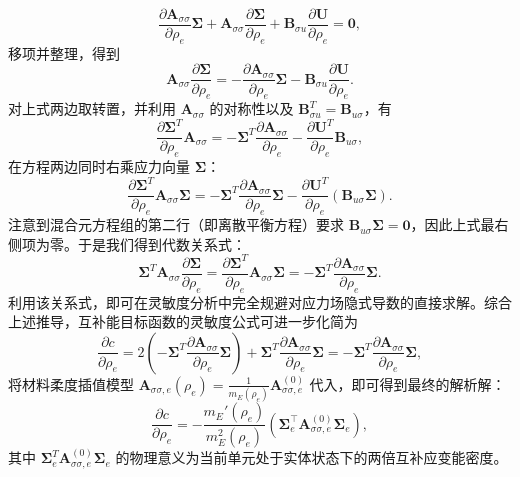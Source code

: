 \[
\frac{\partial \boldsymbol{A}_{\sigma\sigma}}{\partial \rho_e} \boldsymbol{\Sigma} + \boldsymbol{A}_{\sigma\sigma} \frac{\partial \boldsymbol{\Sigma}}{\partial \rho_e} + \boldsymbol{B}_{\sigma u} \frac{\partial \boldsymbol{U}}{\partial \rho_e} = \mathbf{0},
\]
移项并整理，得到
\[
\boldsymbol{A}_{\sigma\sigma} \frac{\partial \boldsymbol{\Sigma}}{\partial \rho_e} = - \frac{\partial \boldsymbol{A}_{\sigma\sigma}}{\partial \rho_e} \boldsymbol{\Sigma} - \boldsymbol{B}_{\sigma u} \frac{\partial \boldsymbol{U}}{\partial \rho_e}.
\]
对上式两边取转置，并利用 $\boldsymbol{A}_{\sigma\sigma}$ 的对称性以及 $\boldsymbol{B}_{\sigma u}^T = \boldsymbol{B}_{u\sigma}$，有
\[
\frac{\partial \boldsymbol{\Sigma}^T}{\partial \rho_e} \boldsymbol{A}_{\sigma\sigma} = - \boldsymbol{\Sigma}^T \frac{\partial \boldsymbol{A}_{\sigma\sigma}}{\partial \rho_e} - \frac{\partial \boldsymbol{U}^T}{\partial \rho_e} \boldsymbol{B}_{u\sigma},
\]
在方程两边同时右乘应力向量 $\boldsymbol{\Sigma}$：
\[
\frac{\partial \boldsymbol{\Sigma}^T}{\partial \rho_e} \boldsymbol{A}_{\sigma\sigma} \boldsymbol{\Sigma} = - \boldsymbol{\Sigma}^T \frac{\partial \boldsymbol{A}_{\sigma\sigma}}{\partial \rho_e} \boldsymbol{\Sigma} - \frac{\partial \boldsymbol{U}^T}{\partial \rho_e} \left( \boldsymbol{B}_{u\sigma} \boldsymbol{\Sigma} \right).
\]
注意到混合元方程组的第二行（即离散平衡方程）要求 $\boldsymbol{B}_{u\sigma}\boldsymbol{\Sigma} = \mathbf{0}$，因此上式最右侧项为零。于是我们得到代数关系式：
\[
\boldsymbol{\Sigma}^T \boldsymbol{A}_{\sigma\sigma} \frac{\partial \boldsymbol{\Sigma}}{\partial \rho_e} = \frac{\partial \boldsymbol{\Sigma}^T}{\partial \rho_e} \boldsymbol{A}_{\sigma\sigma} \boldsymbol{\Sigma} = - \boldsymbol{\Sigma}^T \frac{\partial \boldsymbol{A}_{\sigma\sigma}}{\partial \rho_e} \boldsymbol{\Sigma}.
\]
利用该关系式，即可在灵敏度分析中完全规避对应力场隐式导数的直接求解。综合上述推导，互补能目标函数的灵敏度公式可进一步化简为
\[
\frac{\partial c}{\partial \rho_e} = 2 \left( - \boldsymbol{\Sigma}^T \frac{\partial \boldsymbol{A}_{\sigma\sigma}}{\partial \rho_e} \boldsymbol{\Sigma} \right) + \boldsymbol{\Sigma}^T \frac{\partial \boldsymbol{A}_{\sigma\sigma}}{\partial \rho_e} \boldsymbol{\Sigma} = - \boldsymbol{\Sigma}^T \frac{\partial \boldsymbol{A}_{\sigma\sigma}}{\partial \rho_e} \boldsymbol{\Sigma},
\]
将材料柔度插值模型 $\boldsymbol{A}_{\sigma\sigma, e}(\rho_e) = \frac{1}{m_E(\rho_e)} \boldsymbol{A}_{\sigma\sigma, e}^{(0)}$ 代入，即可得到最终的解析解：
\begin{equation} \label{eq:ch5_hz_compliance_sensitivity}
	\frac{\partial c}{\partial \rho_e} = -\frac{m_E'(\rho_e)}{m_E^2(\rho_e)} \left( \boldsymbol{\Sigma}_e^{\top} \boldsymbol{A}_{\sigma\sigma, e}^{(0)} \boldsymbol{\Sigma}_e \right),
\end{equation}
其中 $\boldsymbol{\Sigma}_e^T \boldsymbol{A}_{\sigma\sigma, e}^{(0)} \boldsymbol{\Sigma}_e$ 的物理意义为当前单元处于实体状态下的两倍互补应变能密度。

